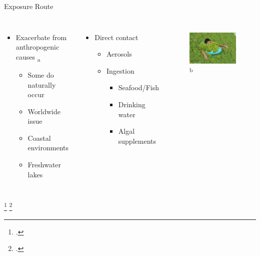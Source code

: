 \begin{frame}{Exposure Route}
	\begin{columns}
	\begin{itemize}
		\item Exacerbate from anthropogenic causes \textsubscript{a}
		\begin{itemize} 
			\item Some do naturally occur
		\item Worldwide issue
		\item Coastal environments
		\item Freshwater lakes
	\end{itemize}
\end{itemize}

	\begin{itemize}
		\item Direct contact
			\begin{itemize}
				\item Aerosols
				\item Ingestion
				\begin{itemize}
					\item Seafood/Fish 
					\item Drinking water
					\item Algal supplements
				\end{itemize}
			\end{itemize}
	\end{itemize}
	\begin{figure}
		\centering
		\includegraphics[width=2in]{swim.jpg} \textsuperscript{b}
		
	\end{figure}
\end{columns}
\footcitetext{[a], rastogi_cyanotoxin-microcystins:_2014}
\footcitetext{[b]https://www.ibtimes.co.uk/china-yellow-sea-turns-green-qingdao-beaches-are-covered-algae-photos-1509734}

\end{frame}
